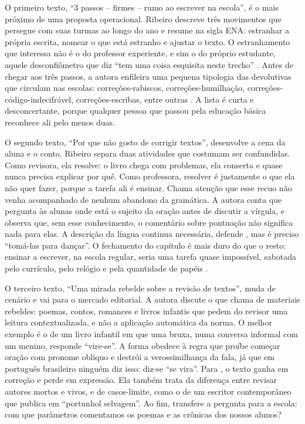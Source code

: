 \documentclass[portuguese]{textolivre}
\begin{document}
O primeiro texto, “3 passos – firmes – rumo ao escrever na escola”, é o mais próximo de uma proposta operacional. Ribeiro descreve três movimentos que persegue com suas turmas ao longo do ano e resume na sigla ENA: estranhar a própria escrita, nomear o que está estranho e ajustar o texto. O estranhamento que interessa não é o do professor experiente, e sim o do próprio estudante, aquele desconfiômetro que diz “tem uma coisa esquisita neste trecho” \cite[p.~16]{ribeiro2025escrever}. Antes de chegar aos três passos, a autora enfileira uma pequena tipologia das devolutivas que circulam nas escolas: correções-rabiscos, correções-humilhação, correções-código-indecifrável, correções-escribas, entre outras \cite[p.~15-16]{ribeiro2025escrever}. A lista é curta e desconcertante, porque qualquer pessoa que passou pela educação básica reconhece ali pelo menos duas.

O segundo texto, “Por que não gosto de corrigir textos”, desenvolve a cena da aluna e o conto. Ribeiro separa duas atividades que costumam ser confundidas. Como revisora, ela resolve: o livro chega com problemas, ela conserta e quase nunca precisa explicar por quê. Como professora, resolver é justamente o que ela não quer fazer, porque a tarefa ali é ensinar. Chama atenção que esse recuo não venha acompanhado de nenhum abandono da gramática. A autora conta que pergunta às alunas onde está o sujeito da oração antes de discutir a vírgula, e observa que, sem esse conhecimento, o comentário sobre pontuação não significa nada para elas. A descrição da língua continua necessária, defende \textcite[p.~28]{ribeiro2025escrever}, mas é preciso “tomá-las para dançar”. O fechamento do capítulo é mais duro do que o resto: ensinar a escrever, na escola regular, seria uma tarefa quase impossível, sabotada pelo currículo, pelo relógio e pela quantidade de papéis \cite[p.~29]{ribeiro2025escrever}.

O terceiro texto, “Uma mirada rebelde sobre a revisão de textos”, muda de cenário e vai para o mercado editorial. A autora discute o que chama de materiais rebeldes: poemas, contos, romances e livros infantis que pedem do revisor uma leitura contextualizada, e não a aplicação automática da norma. O melhor exemplo é o de um livro infantil em que uma bruxa, numa conversa informal com um menino, responde “vire-se”. A forma obedece à regra que proíbe começar oração com pronome oblíquo e destrói a verossimilhança da fala, já que em português brasileiro ninguém diz isso: diz-se “se vira”. Para \textcite[p.~37]{ribeiro2025escrever}, o texto ganha em correção e perde em expressão. Ela também trata da diferença entre revisar autores mortos e vivos, e de casos-limite, como o de um escritor contemporâneo que publica em “portunhol selvagem”. Ao fim, transfere a pergunta para a escola: com que parâmetros comentamos os poemas e as crônicas dos nossos alunos?
\end{document}
